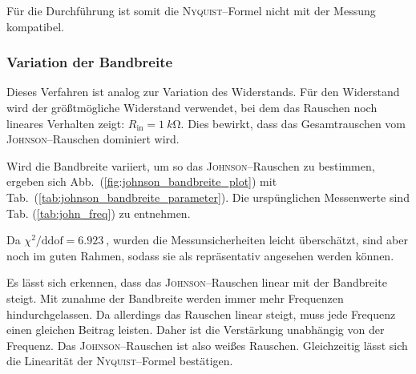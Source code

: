 \documentclass[sn-mathphys-num,iicol]{sn-jnl}
\theoremstyle{thmstyleone}
\theoremstyle{thmstyletwo}
\theoremstyle{thmstylethree}
\begin{document}
Für die Durchführung ist somit die \textsc{Nyquist}--Formel nicht mit der Messung kompatibel.

\subsubsection{Variation der Bandbreite}
Dieses Verfahren ist analog zur Variation des Widerstands.
Für den Widerstand wird der größtmögliche Widerstand verwendet, bei dem das Rauschen noch lineares Verhalten zeigt: $R_\text{in}=\SI{1}{k\ohm}$.
Dies bewirkt, dass das Gesamtrauschen vom \textsc{Johnson}--Rauschen dominiert wird.

Wird die Bandbreite variiert, um so das \textsc{Johnson}--Rauschen zu bestimmen, ergeben sich Abb.\ (\ref{fig:johnson_bandbreite_plot}) mit Tab.\ (\ref{tab:johnson_bandbreite_parameter}). Die urspünglichen Messenwerte sind Tab. (\ref{tab:john_freq}) zu entnehmen.

Da $\chi^2/\text{ddof}=\SI{6.923}{}$, wurden die Messunsicherheiten leicht überschätzt, sind aber noch im guten Rahmen, sodass sie als repräsentativ angesehen werden können.

Es lässt sich erkennen, dass das \textsc{Johnson}--Rauschen linear mit der Bandbreite steigt.
Mit zunahme der Bandbreite werden immer mehr Frequenzen hindurchgelassen. Da allerdings das Rauschen linear steigt, muss jede Frequenz einen gleichen Beitrag leisten. 
Daher ist die Verstärkung unabhängig von der Frequenz.
Das \textsc{Johnson}--Rauschen ist also weißes Rauschen. 
Gleichzeitig lässt sich die Linearität der \textsc{Nyquist}--Formel bestätigen.
\end{document}
